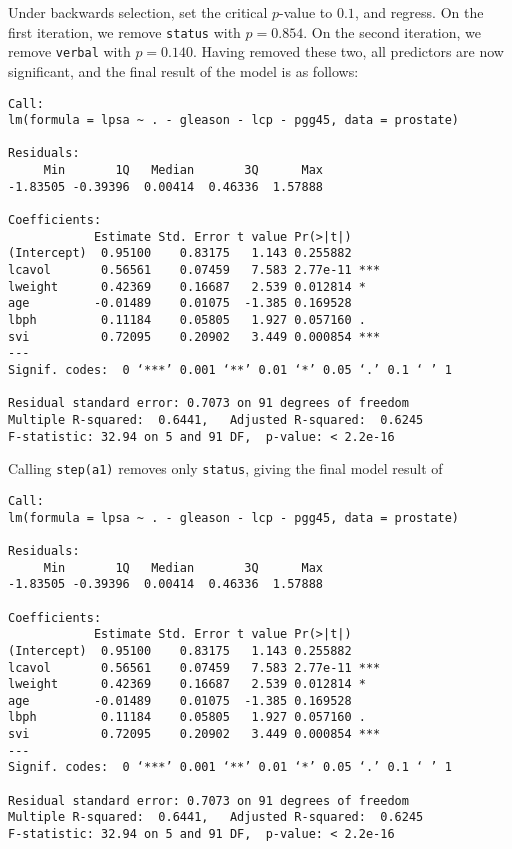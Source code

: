 \documentclass{article}
\begin{document}
%
%
Under backwards selection, set the critical $p$-value to $0.1$, and regress. On the first iteration, we remove \verb|status| with $p=0.854$. On the second iteration, we remove \verb|verbal| with $p=0.140$. Having removed these two, all predictors are now significant, and the final result of the model is as follows:
\begin{verbatim}
Call:
lm(formula = lpsa ~ . - gleason - lcp - pgg45, data = prostate)

Residuals:
     Min       1Q   Median       3Q      Max 
-1.83505 -0.39396  0.00414  0.46336  1.57888 

Coefficients:
            Estimate Std. Error t value Pr(>|t|)    
(Intercept)  0.95100    0.83175   1.143 0.255882    
lcavol       0.56561    0.07459   7.583 2.77e-11 ***
lweight      0.42369    0.16687   2.539 0.012814 *  
age         -0.01489    0.01075  -1.385 0.169528    
lbph         0.11184    0.05805   1.927 0.057160 .  
svi          0.72095    0.20902   3.449 0.000854 ***
---
Signif. codes:  0 ‘***’ 0.001 ‘**’ 0.01 ‘*’ 0.05 ‘.’ 0.1 ‘ ’ 1

Residual standard error: 0.7073 on 91 degrees of freedom
Multiple R-squared:  0.6441,   Adjusted R-squared:  0.6245 
F-statistic: 32.94 on 5 and 91 DF,  p-value: < 2.2e-16
\end{verbatim}
Calling \verb|step(a1)| removes only \verb|status|, giving the final model result of
\begin{verbatim}
Call:
lm(formula = lpsa ~ . - gleason - lcp - pgg45, data = prostate)

Residuals:
     Min       1Q   Median       3Q      Max 
-1.83505 -0.39396  0.00414  0.46336  1.57888 

Coefficients:
            Estimate Std. Error t value Pr(>|t|)    
(Intercept)  0.95100    0.83175   1.143 0.255882    
lcavol       0.56561    0.07459   7.583 2.77e-11 ***
lweight      0.42369    0.16687   2.539 0.012814 *  
age         -0.01489    0.01075  -1.385 0.169528    
lbph         0.11184    0.05805   1.927 0.057160 .  
svi          0.72095    0.20902   3.449 0.000854 ***
---
Signif. codes:  0 ‘***’ 0.001 ‘**’ 0.01 ‘*’ 0.05 ‘.’ 0.1 ‘ ’ 1

Residual standard error: 0.7073 on 91 degrees of freedom
Multiple R-squared:  0.6441,   Adjusted R-squared:  0.6245 
F-statistic: 32.94 on 5 and 91 DF,  p-value: < 2.2e-16
\end{verbatim}
\end{document}
